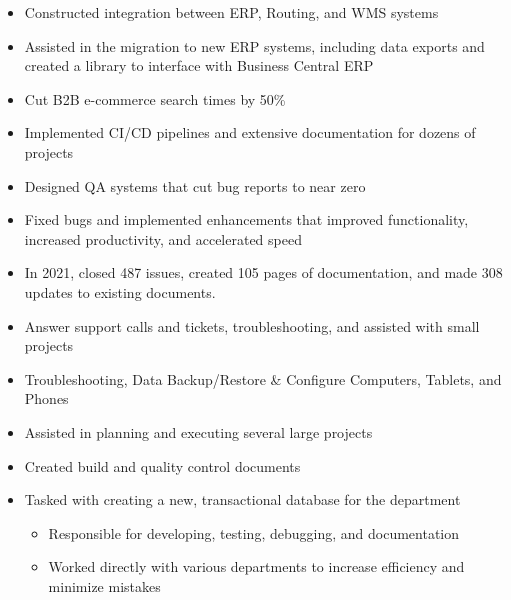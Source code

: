 \documentclass[10pt,a4paper,ragged2e,withhyper]{altacv}
\begin{document}
\begin{paracol}{2}
            \begin{itemize}
                \item Constructed integration between ERP, Routing, and WMS systems
                \item Assisted in the migration to new ERP systems, including data exports and created a library to interface with Business Central ERP
                \item Cut B2B e-commerce search times by 50\%
                \item Implemented CI/CD pipelines and extensive documentation for dozens of projects
                \item Designed QA systems that cut bug reports to near zero
                \item Fixed bugs and implemented enhancements that improved functionality, increased productivity, and accelerated speed
                \item In 2021, closed 487 issues, created 105 pages of documentation, and made 308 updates to existing documents.
            \end{itemize}
            \divider
            
            \begin{itemize}
                \item Answer support calls and tickets, troubleshooting, and assisted with small projects
            \end{itemize}
            \divider
            
            \begin{itemize}
                \item Troubleshooting, Data Backup/Restore & Configure Computers, Tablets, and Phones
                \item Assisted in planning and executing several large projects
                \item Created build and quality control documents
                \item Tasked with creating a new, transactional database for the department
                \begin{itemize}
                    \item Responsible for developing, testing, debugging, and documentation
                    \item Worked directly with various departments to increase efficiency and minimize mistakes
                \end{itemize}
            \end{itemize}
            \medskip
        

\end{paracol}
\end{document}
